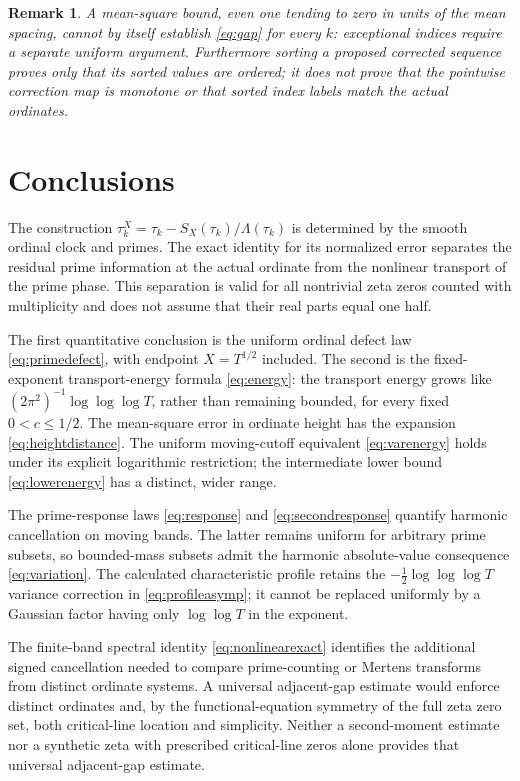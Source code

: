 \documentclass[11pt,reqno]{amsart}
\numberwithin{equation}{section}
\newtheorem{remark}[theorem]{Remark}
\begin{document}
\begin{remark}
A mean-square bound, even one tending to zero in units of the mean spacing, cannot by itself establish \eqref{eq:gap} for every $k$: exceptional indices require a separate uniform argument. Furthermore sorting a proposed corrected sequence proves only that its sorted values are ordered; it does not prove that the pointwise correction map is monotone or that sorted index labels match the actual ordinates.
\end{remark}


\section{Conclusions}\label{sec:conclusions}
The construction $\tau_k^X=\tau_k-S_X(\tau_k)/\Lambda(\tau_k)$
is determined by the smooth ordinal clock and primes.  The exact
identity for its normalized error separates the residual prime
information at the actual ordinate from the nonlinear transport of
the prime phase.  This separation is valid for all nontrivial
zeta zeros counted with multiplicity and does not assume that their
real parts equal one half.

The first quantitative conclusion is the uniform ordinal defect law
\eqref{eq:primedefect}, with endpoint $X=T^{1/2}$ included.  The
second is the fixed-exponent transport-energy formula
\eqref{eq:energy}: the transport energy grows like
$(2\pi^2)^{-1}\log\log\log T$, rather than remaining bounded,
for every fixed $0<c\le1/2$.  The mean-square error in
ordinate height has the expansion \eqref{eq:heightdistance}.
The uniform moving-cutoff equivalent \eqref{eq:varenergy} holds
under its explicit logarithmic restriction; the intermediate
lower bound \eqref{eq:lowerenergy} has a distinct, wider range.

The prime-response laws \eqref{eq:response} and
\eqref{eq:secondresponse} quantify harmonic cancellation on
moving bands.  The latter remains uniform for arbitrary
prime subsets, so bounded-mass subsets admit the harmonic
absolute-value consequence \eqref{eq:variation}.
The calculated characteristic profile retains the
$-\frac12\log\log\log T$ variance correction in
\eqref{eq:profileasymp}; it cannot be replaced uniformly
by a Gaussian factor having only $\log\log T$ in the exponent.

The finite-band spectral identity \eqref{eq:nonlinearexact}
identifies the additional signed cancellation needed to compare
prime-counting or Mertens transforms from distinct ordinate systems.
A universal adjacent-gap estimate would enforce distinct ordinates
and, by the functional-equation symmetry of the full zeta zero set,
both critical-line location and simplicity.  Neither a second-moment
estimate nor a synthetic zeta with prescribed critical-line zeros
alone provides that universal adjacent-gap estimate.
\end{document}
